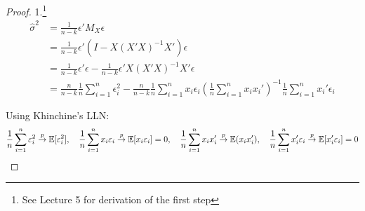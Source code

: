 \documentclass[DIV=14,titlepage=false]{scrreprt}
\begin{document}
\begin{proof}
    1.\footnote{See Lecture 5 for derivation of the first step}
    \begin{align*}
        \hat\sigma^2 &= \frac{1}{n-k} \epsilon' M_X \epsilon \\
        &= \frac{1}{n-k} \epsilon' (I-X(X'X)^{-1}X')\epsilon\\
        &= \frac{1}{n-k} \epsilon'\epsilon - \frac{1}{n-k} \epsilon' X(X'X)^{-1}X'\epsilon\\
        &= \frac{n}{n-k} \frac{1}{n} \sum_{i=1}^{n}\epsilon_i^2 - \frac{n}{n-k} \frac{1}{n} \sum_{i=1}^{n} x_i \epsilon_i \left(\frac{1}{n}\sum_{i=1}^{n} x_i x_i'\right)^{-1} \frac{1}{n} \sum_{i=1}^{n} x_i' \epsilon_i
    \end{align*}
    
    Using Khinchine's LLN:
    \[
        \frac{1}{n} \sum_{i=1}^{n}\varepsilon_i^2 \overset{p}{\to} \mathbb{E}[\varepsilon_i^2], \quad
        \frac{1}{n} \sum_{i=1}^{n}x_i\varepsilon_i \overset{p}{\to} \mathbb{E}[x_i \varepsilon_i]=0, \quad
        \frac{1}{n} \sum_{i=1}^{n} x_i x_i' \overset{p}{\to} \mathbb{E}(x_ix_i'), \quad
        \frac{1}{n} \sum_{i=1}^{n}x_i' \varepsilon_i \overset{p}{\to} \mathbb{E}[x_i' \varepsilon_i]=0
    \]
    

\end{proof}
\end{document}
